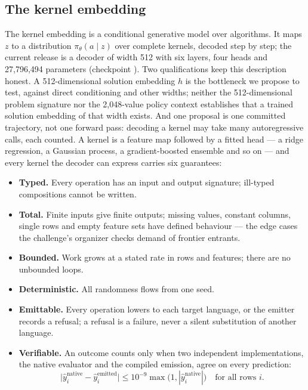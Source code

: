 \subsection{The kernel embedding}

The kernel embedding is a conditional generative model over algorithms. It maps $z$ to a
distribution $\pi_\theta(a\mid z)$ over complete kernels, decoded step by step; the current release
is a decoder of width 512 with six layers, four heads and 27,796,494 parameters
(checkpoint ). Two qualifications keep this description honest. A
512-dimensional solution embedding $h$ is the bottleneck we propose to test, against direct
conditioning and other widths; neither the 512-dimensional problem signature nor the 2,048-value
policy context establishes that a trained solution embedding of that width exists. And one
proposal is one committed trajectory, not one forward pass: decoding a kernel may take many
autoregressive calls, each counted. A kernel is a feature map followed by a fitted head --- a
ridge regression, a Gaussian process, a gradient-boosted ensemble and so on --- and every kernel the
decoder can express carries six guarantees:
\begin{itemize}
\item \textbf{Typed.} Every operation has an input and output signature; ill-typed compositions
cannot be written.
\item \textbf{Total.} Finite inputs give finite outputs; missing values, constant columns, single
rows and empty feature sets have defined behaviour --- the edge cases the challenge's organizer
checks demand of frontier entrants.
\item \textbf{Bounded.} Work grows at a stated rate in rows and features; there are no unbounded
loops.
\item \textbf{Deterministic.} All randomness flows from one seed.
\item \textbf{Emittable.} Every operation lowers to each target language, or the emitter records a
refusal; a refusal is a failure, never a silent substitution of another language.
\item \textbf{Verifiable.} An outcome counts only when two independent implementations, the native
evaluator and the compiled emission, agree on every prediction:
\begin{equation}
\bigl|\hat y^{\mathrm{native}}_i - \hat y^{\mathrm{emitted}}_i\bigr| \le 10^{-9}\max\bigl(1, |\hat y^{\mathrm{native}}_i|\bigr)
\quad\text{for all rows } i.
\label{eq:parity}
\end{equation}
\end{itemize}

